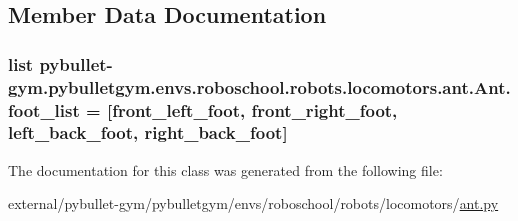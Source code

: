 \subsection{Member Data Documentation}
\subsubsection[{\texorpdfstring{foot\+\_\+list}{foot_list}}]{\setlength{\rightskip}{0pt plus 5cm}list pybullet-\/gym.\+pybulletgym.\+envs.\+roboschool.\+robots.\+locomotors.\+ant.\+Ant.\+foot\+\_\+list = \mbox{[}\textquotesingle{}front\+\_\+left\+\_\+foot\textquotesingle{}, \textquotesingle{}front\+\_\+right\+\_\+foot\textquotesingle{}, \textquotesingle{}left\+\_\+back\+\_\+foot\textquotesingle{}, \textquotesingle{}right\+\_\+back\+\_\+foot\textquotesingle{}\mbox{]}\hspace{0.3cm}{\ttfamily [static]}}\hypertarget{classpybullet-gym_1_1pybulletgym_1_1envs_1_1roboschool_1_1robots_1_1locomotors_1_1ant_1_1_ant_a3ab9cb3a5cb46dd858aa031a3c63cd7d}{}\label{classpybullet-gym_1_1pybulletgym_1_1envs_1_1roboschool_1_1robots_1_1locomotors_1_1ant_1_1_ant_a3ab9cb3a5cb46dd858aa031a3c63cd7d}


The documentation for this class was generated from the following file\+:\begin{DoxyCompactItemize}
\item 
external/pybullet-\/gym/pybulletgym/envs/roboschool/robots/locomotors/\hyperlink{roboschool_2robots_2locomotors_2ant_8py}{ant.\+py}\end{DoxyCompactItemize}
